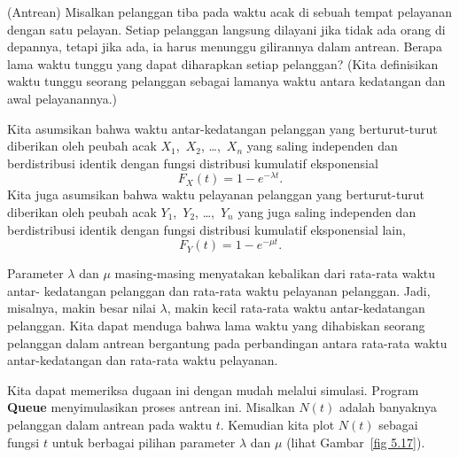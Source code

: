 \begin{example}(Antrean)\label{exam 5.21} Misalkan pelanggan tiba pada waktu
acak di sebuah tempat pelayanan dengan satu pelayan.  Setiap pelanggan langsung dilayani jika
tidak ada orang di depannya, tetapi jika ada, ia harus menunggu gilirannya dalam antrean.  Berapa
lama waktu tunggu yang dapat diharapkan setiap pelanggan?  (Kita definisikan waktu tunggu seorang
pelanggan sebagai lamanya waktu antara kedatangan dan awal pelayanannya.)
\par
Kita asumsikan bahwa waktu antar-kedatangan pelanggan yang berturut-turut diberikan oleh peubah
acak $X_1$,~$X_2$, \dots,~$X_n$ yang saling independen dan berdistribusi identik dengan fungsi
distribusi kumulatif eksponensial
$$ F_X(t) = 1 - e^{-\lambda t}.
$$ 
Kita juga asumsikan bahwa waktu pelayanan pelanggan yang berturut-turut diberikan oleh peubah acak
$Y_1$,~$Y_2$, \dots,~$Y_n$ yang juga saling independen dan berdistribusi identik dengan fungsi
distribusi kumulatif eksponensial lain,
$$ F_Y(t) = 1 - e^{-\mu t}.
$$ 
\par
Parameter $\lambda$ dan $\mu$ masing-masing menyatakan kebalikan dari rata-rata waktu antar-
kedatangan pelanggan dan rata-rata waktu
pelayanan pelanggan.  Jadi, misalnya, makin besar nilai
$\lambda$, makin kecil rata-rata waktu antar-kedatangan pelanggan.  Kita dapat menduga bahwa lama
waktu yang dihabiskan seorang pelanggan dalam antrean bergantung pada perbandingan antara rata-rata
waktu antar-kedatangan dan rata-rata waktu pelayanan.
\par
Kita dapat memeriksa dugaan ini dengan mudah melalui simulasi.  Program {\bf Queue} menyimulasikan proses antrean ini.  Misalkan $N(t)$ adalah banyaknya pelanggan dalam
antrean pada waktu $t$.  Kemudian kita plot $N(t)$ sebagai fungsi $t$ untuk berbagai pilihan parameter
$\lambda$ dan
$\mu$ (lihat Gambar~\ref{fig 5.17}).



\end{example}
